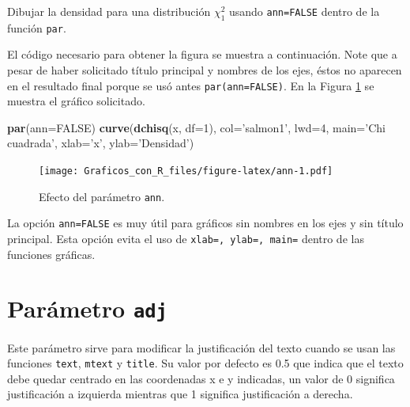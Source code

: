 \documentclass[10pt,]{krantz}
\makeatletter
\newenvironment{Shaded}{\begin{snugshade}}{\end{snugshade}}
\newcommand{\KeywordTok}[1]{\textcolor[rgb]{0.13,0.29,0.53}{\textbf{{#1}}}}
\newcommand{\DataTypeTok}[1]{\textcolor[rgb]{0.13,0.29,0.53}{{#1}}}
\newcommand{\DecValTok}[1]{\textcolor[rgb]{0.00,0.00,0.81}{{#1}}}
\newcommand{\StringTok}[1]{\textcolor[rgb]{0.31,0.60,0.02}{{#1}}}
\newcommand{\OtherTok}[1]{\textcolor[rgb]{0.56,0.35,0.01}{{#1}}}
\newcommand{\NormalTok}[1]{{#1}}
\newenvironment{kframe}{%
\medskip{}
\setlength{\fboxsep}{.8em}
 \def\at@end@of@kframe{}%
 \ifinner\ifhmode%
  \def\at@end@of@kframe{\end{minipage}}%
  \begin{minipage}{\columnwidth}%
 \fi\fi%
 \def\FrameCommand##1{\hskip\@totalleftmargin \hskip-\fboxsep
 \colorbox{shadecolor}{##1}\hskip-\fboxsep
     \hskip-\linewidth \hskip-\@totalleftmargin \hskip\columnwidth}%
 \MakeFramed {\advance\hsize-\width
   \@totalleftmargin\z@ \linewidth\hsize
   \@setminipage}}%
 {\par\unskip\endMakeFramed%
 \at@end@of@kframe}
\renewenvironment{Shaded}{\begin{kframe}}{\end{kframe}}
\let\BeginKnitrBlock\begin \let\EndKnitrBlock\end
\makeatother
\begin{document}
Dibujar la densidad para una distribución \(\chi^2_1\) usando
\texttt{ann=FALSE} dentro de la función \texttt{par}.

El código necesario para obtener la figura se muestra a continuación.
Note que a pesar de haber solicitado título principal y nombres de los
ejes, éstos no aparecen en el resultado final porque se usó antes
\texttt{par(ann=FALSE)}. En la Figura \ref{fig:ann} se muestra el
gráfico solicitado.

\begin{Shaded}
\begin{Highlighting}[]
\KeywordTok{par}\NormalTok{(}\DataTypeTok{ann=}\OtherTok{FALSE}\NormalTok{)}
\KeywordTok{curve}\NormalTok{(}\KeywordTok{dchisq}\NormalTok{(x, }\DataTypeTok{df=}\DecValTok{1}\NormalTok{), }\DataTypeTok{col=}\StringTok{'salmon1'}\NormalTok{, }\DataTypeTok{lwd=}\DecValTok{4}\NormalTok{,}
      \DataTypeTok{main=}\StringTok{'Chi cuadrada'}\NormalTok{,}
      \DataTypeTok{xlab=}\StringTok{'x'}\NormalTok{, }\DataTypeTok{ylab=}\StringTok{'Densidad'}\NormalTok{)}
\end{Highlighting}
\end{Shaded}

\begin{figure}[htbp]
\centering
\texttt{[image: Graficos\_con\_R\_files/figure-latex/ann-1.pdf]}
\caption{\label{fig:ann}Efecto del parámetro \texttt{ann}.}
\end{figure}

\BeginKnitrBlock{rmdnote}
La opción \texttt{ann=FALSE} es muy útil para gráficos sin nombres en
los ejes y sin título principal. Esta opción evita el uso de
\texttt{xlab=\textquotesingle{}\textquotesingle{},\ ylab=\textquotesingle{}\textquotesingle{},\ main=\textquotesingle{}\textquotesingle{}}
dentro de las funciones gráficas.
\EndKnitrBlock{rmdnote}

\section{\texorpdfstring{Parámetro \texttt{adj}
}{Parámetro adj  }}\label{parametro-adj}

Este parámetro sirve para modificar la justificación del texto cuando se
usan las funciones \texttt{text}, \texttt{mtext} y \texttt{title}. Su
valor por defecto es 0.5 que indica que el texto debe quedar centrado en
las coordenadas x e y indicadas, un valor de 0 significa justificación a
izquierda mientras que 1 significa justificación a derecha.
\end{document}
